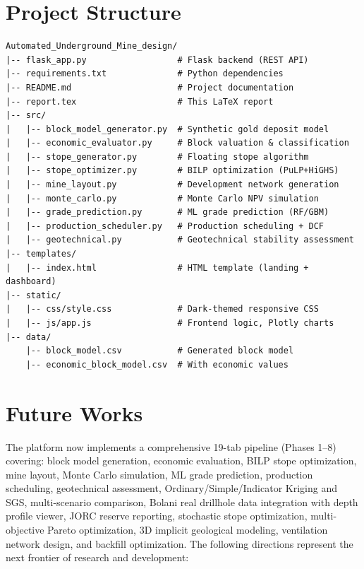 \documentclass[12pt,a4paper]{article}
\begin{document}
\section{Project Structure}
\label{sec:structure}

\begin{lstlisting}[caption={Project directory structure}]
Automated_Underground_Mine_design/
|-- flask_app.py                  # Flask backend (REST API)
|-- requirements.txt              # Python dependencies
|-- README.md                     # Project documentation
|-- report.tex                    # This LaTeX report
|-- src/
|   |-- block_model_generator.py  # Synthetic gold deposit model
|   |-- economic_evaluator.py     # Block valuation & classification
|   |-- stope_generator.py        # Floating stope algorithm
|   |-- stope_optimizer.py        # BILP optimization (PuLP+HiGHS)
|   |-- mine_layout.py            # Development network generation
|   |-- monte_carlo.py            # Monte Carlo NPV simulation
|   |-- grade_prediction.py       # ML grade prediction (RF/GBM)
|   |-- production_scheduler.py   # Production scheduling + DCF
|   |-- geotechnical.py           # Geotechnical stability assessment
|-- templates/
|   |-- index.html                # HTML template (landing + dashboard)
|-- static/
|   |-- css/style.css             # Dark-themed responsive CSS
|   |-- js/app.js                 # Frontend logic, Plotly charts
|-- data/
    |-- block_model.csv           # Generated block model
    |-- economic_block_model.csv  # With economic values
\end{lstlisting}

\section{Future Works}
\label{sec:future}

The platform now implements a comprehensive 19-tab pipeline (Phases 1--8) covering: block model generation, economic evaluation, BILP stope optimization, mine layout, Monte Carlo simulation, ML grade prediction, production scheduling, geotechnical assessment, Ordinary/Simple/Indicator Kriging and SGS, multi-scenario comparison, Bolani real drillhole data integration with depth profile viewer, JORC reserve reporting, stochastic stope optimization, multi-objective Pareto optimization, 3D implicit geological modeling, ventilation network design, and backfill optimization. The following directions represent the next frontier of research and development:
\end{document}
